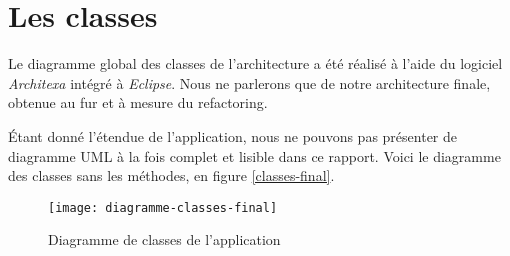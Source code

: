 \section{Les classes}

Le diagramme global des classes de l'architecture a été réalisé à l'aide du logiciel \emph{Architexa} intégré à \emph{Eclipse}. Nous ne parlerons que de notre architecture finale, obtenue au fur et à mesure du refactoring.

Étant donné l'étendue de l'application, nous ne pouvons pas présenter de diagramme UML à la fois complet et lisible dans ce rapport. Voici le diagramme des classes sans les méthodes, en figure \vref{classes-final}. 

\begin{figure}[h]
\begin{center}
    \texttt{[image: diagramme-classes-final]}
\end{center}
    \caption{Diagramme de classes de l'application}
    \label{classes-final}
\end{figure}